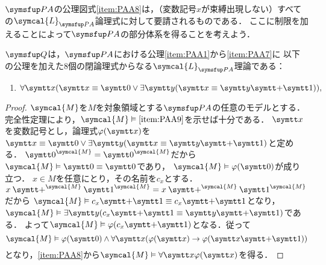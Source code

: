 \(\PA\)の公理図式\cref{item:PAA8}は，（変数記号\(x\)が束縛出現しない）すべての\(\symcal{L}_{\PA}\)論理式に対して要請されるものである．
ここに制限を加えることによって\(\PA\)の部分体系を得ることを考えよう．

\begin{Def} \label{Def:robinsonarithmetic}
	\(\Robinson\)は，\(\PA\)における公理\cref{item:PAA1}から\cref{item:PAA7}に
	以下の公理を加えた8個の閉論理式からなる\(\symcal{L}_{\PA}\)理論である：
	\begin{enumerate}[label=A\arabic*.,ref=A\arabic*,start=9]
		\item \label{item:PAA9} \(\forall \obj{x} \paren{\obj{x} \objeq \obj{0} \lor \exists \obj{y} \paren{\obj{x} \objeq \obj{y} \obj{+} \obj{1}}},\)
	\end{enumerate}
\end{Def}


\begin{proof}
	\(\symcal{M}\)を\(M\)を対象領域とする\(\PA\)の任意のモデルとする．
	完全性定理により，\(\symcal{M} \satisfy \text{\cref{item:PAA9}}\)を示せば十分である．
	\(\obj{x}\)を変数記号とし，論理式\(\apply{\varphi}{\obj{x}}\)を\(\obj{x} \objeq \obj{0} \lor \exists \obj{y} \paren{\obj{x} \objeq \obj{y} \obj{+} \obj{1}}\)と定める．
	\(\interpretation{\symcal{M}}{\obj{0}} = \interpretation{\symcal{M}}{\obj{0}}\)だから
	\(\symcal{M} \satisfy \obj{0} \objeq \obj{0}\)であり，
	\(\symcal{M} \satisfy \apply{\varphi}{\obj{0}}\)が成り立つ．
	\(x \in M\)を任意にとり，その名前を\(c_x\)とする．
	\(x \mathbin{\interpretation{\symcal{M}}{\obj{+}}} \interpretation{\symcal{M}}{\obj{1}} = x \mathbin{\interpretation{\symcal{M}}{\obj{+}}} \interpretation{\symcal{M}}{\obj{1}}\)だから
	\(\symcal{M} \satisfy c_x \obj{+} \obj{1} \objeq c_x \obj{+} \obj{1}\)となり，
	\(\symcal{M} \satisfy \exists \obj{y} \paren{c_x \obj{+} \obj{1} \objeq \obj{y} \obj{+} \obj{1}}\)である．
	よって\(\symcal{M} \satisfy \apply{\varphi}{c_x \obj{+} \obj{1}}\)となる．従って
	\[
		\symcal{M} \satisfy \apply{\varphi}{\obj{0}} \land \forall \obj{x} \paren{\apply{\varphi}{\obj{x}} \to \apply{\varphi}{\obj{x} \obj{+} \obj{1}}}
	\]
	となり，\cref{item:PAA8}から\(\symcal{M} \satisfy \forall \obj{x} \apply{\varphi}{\obj{x}}\)を得る．
\end{proof}


